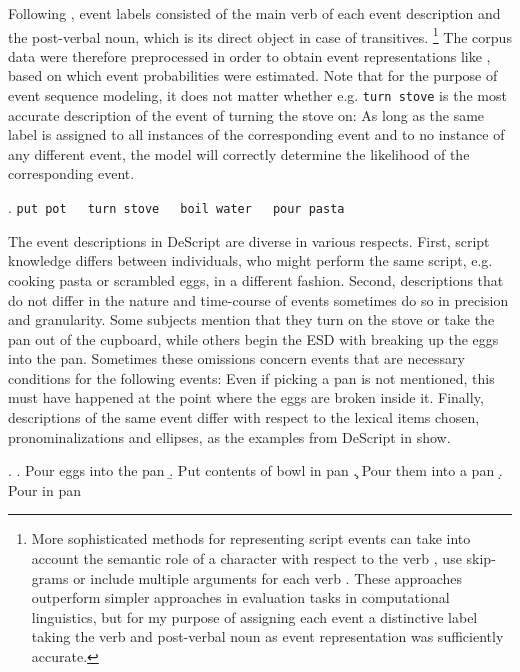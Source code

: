 Following \citet{manshadi.etal2008}, event labels consisted of the main verb of each event description and the post-verbal noun, which is its direct object in case of transitives.%
%
\footnote{More sophisticated methods for representing script events can take into account the semantic role of a character with respect to the verb \citep{chambers.jurafsky2008}, use skip-grams \citep{jans.etal2012} or include multiple arguments for each verb \citep{chambers.jurafsky2009, pichotta.mooney2014}. These approaches outperform simpler approaches in evaluation tasks in computational linguistics, but for my purpose of assigning each event a distinctive label taking the verb and post-verbal noun as event representation was sufficiently accurate.}\afterfn%
%
The corpus data were therefore preprocessed in order to obtain event representations like \Next, based on which event probabilities were estimated. Note that for the purpose of event sequence modeling, it does not matter whether e.g. \texttt{turn stove} is the most accurate description of the event of turning the stove on:  As long as the same label is assigned to all instances of the corresponding event and to no instance of any different event, the model will correctly determine the likelihood of the corresponding event. 

\ex. \texttt{put pot}~~~\texttt{turn stove}~~~\texttt{boil water}~~~\texttt{pour pasta}  

The event descriptions in DeScript are diverse in various respects. First, script knowledge differs between individuals, who might perform the same script, e.g. cooking pasta or scrambled eggs, in a different fashion. Second, descriptions that do not differ in the nature and time-course of events sometimes do so in precision and granularity. Some subjects mention that they turn on the stove or take the pan out of the cupboard, while others begin the ESD with breaking up the eggs into the pan. Sometimes these omissions concern events that are necessary conditions for the following events: Even if picking a pan is not mentioned, this must have happened at the point where the eggs are broken inside it. Finally, descriptions of the same event differ with respect to the lexical items chosen, pronominalizations and ellipses, as the examples from DeScript in \Next show.

\ex.    \label{ex:scripts-synonym}
\a. Pour eggs into the pan
\b. Put contents of bowl in pan
      \c. Pour them into a pan
      \d. Pour in pan

